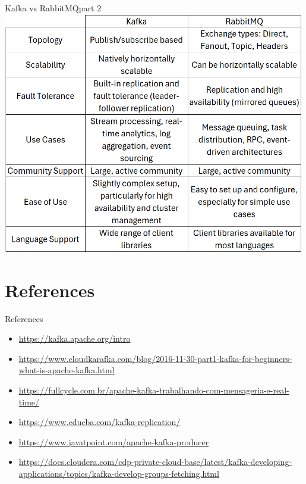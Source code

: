 \documentclass{beamer}
\begin{document}
\begin{frame}{Kafka vs RabbitMQ}{part 2}
  \includegraphics[width=0.99\textwidth]{fig/vs2.png}
\end{frame}


\section[References]{References}

\begin{frame}{References}
  \begin{itemize}
    \item \url{https://kafka.apache.org/intro}
    \item \url{https://www.cloudkarafka.com/blog/2016-11-30-part1-kafka-for-beginners-what-is-apache-kafka.html}
    \item \url{https://fullcycle.com.br/apache-kafka-trabalhando-com-mensageria-e-real-time/}
    \item \url{https://www.educba.com/kafka-replication/}
    \item \url{https://www.javatpoint.com/apache-kafka-producer}
    \item \url{https://docs.cloudera.com/cdp-private-cloud-base/latest/kafka-developing-applications/topics/kafka-develop-groups-fetching.html}
  \end{itemize}
\end{frame}
\end{document}
